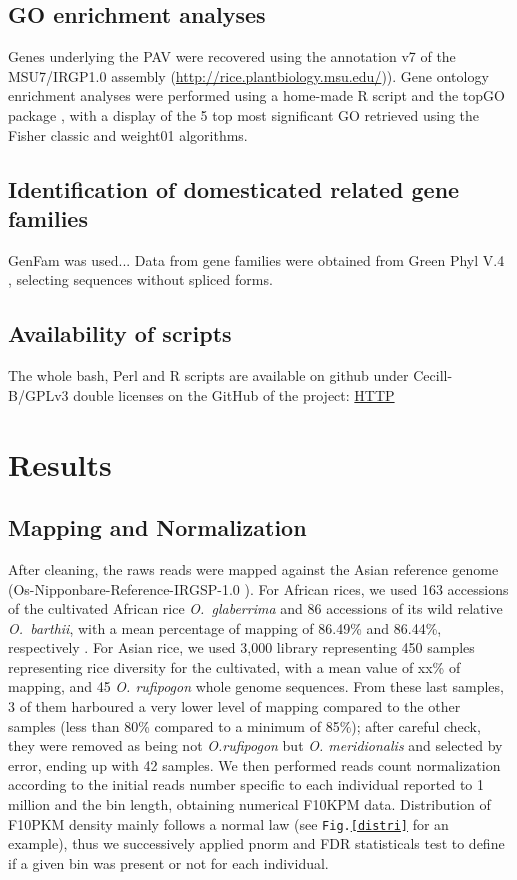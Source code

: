 \documentclass[10pt,letterpaper]{article}
\begin{document}
\subsection*{GO enrichment analyses}
Genes underlying the PAV were recovered using the annotation v7 of the MSU7/IRGP1.0 assembly (\url{http://rice.plantbiology.msu.edu/})). Gene ontology enrichment analyses were performed using a home-made R script and the topGO package \cite{Alexa2016}, with a display of the 5 top most significant GO retrieved using the Fisher classic and weight01 algorithms.

\subsection*{Identification of domesticated related gene families}
GenFam was used...
Data from gene families were obtained from Green Phyl V.4 \cite{Conte2008b, Conte2008a, Rouard2011}, selecting sequences without spliced forms.

\subsection*{Availability of scripts}
The whole bash, Perl and R scripts are available on github under Cecill-B/GPLv3 double licenses on the GitHub of the project: \url{HTTP}

\section*{Results}
\subsection*{Mapping and Normalization}
After cleaning, the raws reads were mapped against the Asian reference genome (Os-Nipponbare-Reference-IRGSP-1.0 \cite{Mcnally2009, Kawahara2013}). For African rices, we used 163 accessions of the cultivated African rice \textit{O.~glaberrima} and 86 accessions of its wild relative \textit{O.~barthii}, with a mean percentage of mapping of 86.49\% and 86.44\%, respectively \cite{Cubry2018}. For Asian rice, we used 3,000 library representing 450 samples representing rice diversity for the cultivated, with a mean value of xx\% of mapping, and 45 \textit{O. rufipogon} whole genome sequences. From these last samples, 3 of them harboured a very lower level of mapping compared to the other samples (less than 80\% compared to a minimum of 85\%); after careful check, they were removed as being not \textit{O.rufipogon} but \textit{O. meridionalis} and selected by error, ending up with 42 samples. We then performed reads count normalization according to the initial reads number specific to each individual reported to 1 million and the bin length, obtaining numerical F10KPM data. Distribution of F10PKM density mainly follows a normal law (see \texttt{Fig.\ref{distri}} for an example), thus we successively applied pnorm and FDR statisticals test to define if a given bin was present or not for each individual.
\end{document}
